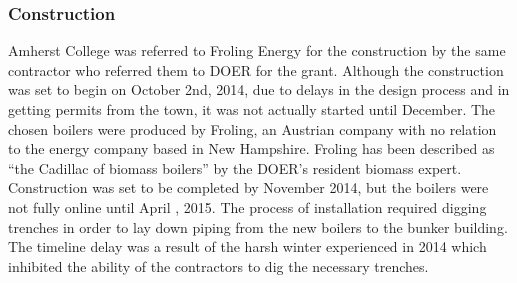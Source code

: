 \subsubsection{Construction}
\par Amherst College was referred to Froling Energy for the construction by the same contractor who referred them to DOER for the grant. Although the construction was set to begin on October 2nd, 2014, due to delays in the design process and in getting permits from the town, it was not actually started until December. The chosen boilers were produced by Froling, an Austrian company with no relation to the energy company based in New Hampshire. Froling has been described as “the Cadillac of biomass boilers” by the DOER’s resident biomass expert. Construction was set to be completed by November  2014, but the boilers were not fully online until April , 2015. The process of installation required digging trenches in order to lay down piping from the new boilers to the bunker building. The timeline delay was a result of the harsh winter experienced in 2014 which inhibited the ability of the contractors to dig the necessary trenches.

